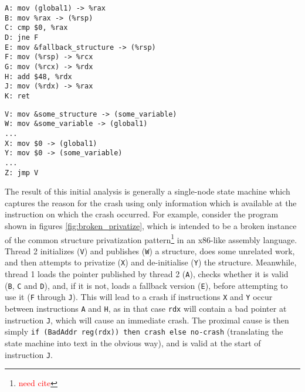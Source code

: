 \documentclass[10pt,twocolumn,preprint,natbib,authoryear]{sigplanconf}
\makeatletter
\newcommand{\editorial}[1]{\textcolor{red}{\footnote{\textcolor{red}{#1}}}}
\newcommand{\needCite}{\editorial{need cite}}
\newenvironment{subfloat}%
    {\def\caption##1{\gdef\subcapsave{\relax##1}}%
     \let\subcapsave=\@empty %
     \let\sf@oldlabel=\label
     \def\label##1{\xdef\sublabsave{\noexpand\label{##1}}}%
     \let\sublabsave\relax    %
     \setbox\subfigbox\hbox
       \bgroup}%
      {\egroup                %
     \let\label=\sf@oldlabel
     \subfigure[\subcapsave]{\box\subfigbox}}%
\makeatother
\begin{document}
\begin{figure*}
 \begin{subfloat}
  \begin{minipage}{90mm}
\begin{verbatim}
A: mov (global1) -> %rax
B: mov %rax -> (%rsp)
C: cmp $0, %rax
D: jne F
E: mov &fallback_structure -> (%rsp)
F: mov (%rsp) -> %rcx
G: mov (%rcx) -> %rdx
H: add $48, %rdx
J: mov (%rdx) -> %rax
K: ret
\end{verbatim}
  \end{minipage}
  \caption{Thread 1}
 \end{subfloat}
 \begin{subfloat}
  \begin{minipage}{90mm}
\begin{verbatim}
V: mov &some_structure -> (some_variable)
W: mov &some_variable -> (global1)
...
X: mov $0 -> (global1)
Y: mov $0 -> (some_variable)
...
Z: jmp V
\end{verbatim}
  \end{minipage}
  \caption{Thread 2}
 \end{subfloat}
 \caption{A broken example of the privatize synchronization pattern.}
 \label{fig:broken_privatize}
\end{figure*}

The result of this initial analysis is generally a single-node state
machine which captures the reason for the crash using only information
which is available at the instruction on which the crash occurred.
For example, consider the program shown in figures
\ref{fig:broken_privatize}, which is intended to be a broken instance
of the common structure privatization pattern\needCite{} in an
x86-like assembly language.  Thread 2 initializes (\verb|V|) and
publishes (\verb|W|) a structure, does some unrelated work, and then
attempts to privatize (\verb|X|) and de-initialise (\verb|Y|) the
structure.  Meanwhile, thread 1 loads the pointer published by thread
2 (\verb|A|), checks whether it is valid (\verb|B|, \verb|C| and
\verb|D|), and, if it is not, loads a fallback version (\verb|E|),
before attempting to use it (\verb|F| through \verb|J|).  This will
lead to a crash if instructions \verb|X| and \verb|Y| occur between
instructions \verb|A| and \verb|H|, as in that case \verb|rdx| will
contain a bad pointer at instruction \verb|J|, which will cause an
immediate crash.  The proximal cause is then simply
\verb|if (BadAddr reg(rdx)) then crash else no-crash| (translating the
state machine into text in the obvious way), and is valid at the start
of instruction \verb|J|.
\end{document}
